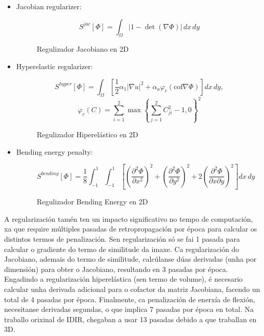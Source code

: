  \begin{itemize}
    \item Jacobian regularizer:
    \begin{figure}[ht!]
        \centering
        \[
        S^{jac}[\Phi] = \int_{\Omega} \left| 1 - \det \left( \nabla \Phi \right) \right| \, dx \, dy
        \]
        \caption{Regulizador Jacobiano en 2D}
    \end{figure}
    
    \item Hyperelastic regularizer:
    \begin{figure}[ht!]
        \centering
        \[
        S^{hyper}[\Phi] = \int_{\Omega} \left[ \frac{1}{2} \alpha_1 |\nabla u|^2 + \alpha_a \varphi_c (\text{cof} \nabla \Phi) \right] dx \, dy,
        \]
        \[
        \varphi_c(C) = \sum_{i=1}^2 \max \left\{ \sum_{j=1}^2 C_{ji}^2 - 1, 0 \right\}^2
        \]
        \caption{Regulizador Hiperelástico en 2D}
    \end{figure}
    
    \item Bending energy penalty:
    \begin{figure}[ht!]
        \centering
        \[
        S^{bending}[\Phi] = \frac{1}{8} \int_{-1}^{1} \int_{-1}^{1} \left[ \left( \frac{\partial^2 \Phi}{\partial x^2} \right)^2 + \left( \frac{\partial^2 \Phi}{\partial y^2} \right)^2 + 2 \left( \frac{\partial^2 \Phi}{\partial x \partial y} \right)^2 \right] dx \, dy
        \]
        \caption{Regulizador Bending Energy en 2D}
    \end{figure}
    
\end{itemize}

A regularización tamén ten un impacto significativo no tempo de computación, xa que require múltiples pasadas de retropropagación por época para calcular os distintos termos de penalización.
Sen regularización só se fai 1 pasada para calcular o gradiente do termo de similitude da imaxe.
Ca regularización do Jacobiano, ademais do termo de similitude, calcúlanse dúas derivadas (unha por dimensión) para obter o Jacobiano, resultando en 3 pasadas por época.
Engadindo a regularización hiperelástica (sen termo de volume), é necesario calcular unha derivada adicional para o cofactor da matriz Jacobiana, facendo un total de 4 pasadas por época.
Finalmente, ca penalización de enerxía de flexión, necesitanse derivadas segundas, o que implica 7 pasadas por época en total.
Na traballo orixinal de IDIR, chegaban a usar 13 pasadas debido a que traballan en 3D.

